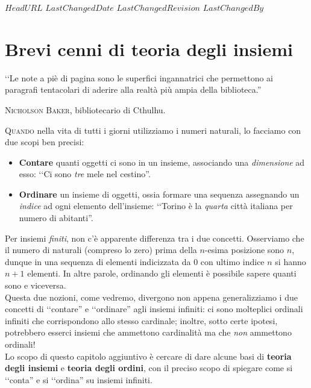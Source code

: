 \svnidlong
{$HeadURL$}
{$LastChangedDate$}
{$LastChangedRevision$}
{$LastChangedBy$}

\chapter{Brevi cenni di teoria degli insiemi}
\begin{introduction}
‘‘Le note a piè di pagina sono le superfici ingannatrici che permettono ai paragrafi tentacolari di aderire alla realtà più ampia della biblioteca.''
\begin{flushright}
	\textsc{Nicholson Baker,} bibliotecario di Cthulhu.
\end{flushright}
\end{introduction}
\lettrine[findent=1pt, nindent=0pt]{Q}{uando} nella vita di tutti i giorni utilizziamo i numeri naturali, lo facciamo con due scopi ben precisi:\\
\begin{itemize}
	\item \textbf{Contare} quanti oggetti ci sono in un insieme, associando una \textit{dimensione} ad esso: ‘‘Ci sono \textit{tre} mele nel cestino''.
	\item \textbf{Ordinare} un insieme di oggetti, ossia formare una sequenza assegnando un \textit{indice} ad ogni elemento dell'insieme: ‘‘Torino è la \textit{quarta} città italiana per numero di abitanti''.
\end{itemize}
\noindent Per insiemi \textit{finiti}, non c'è apparente differenza tra i due concetti. Osserviamo che il numero di naturali (compreso lo zero) prima della $n$-esima posizione sono $n$, dunque in una sequenza di elementi indicizzata da $0$ con ultimo indice $n$ si hanno $n+1$ elementi. In altre parole, ordinando gli elementi è possibile sapere quanti sono e viceversa.\\
Questa due nozioni, come vedremo, divergono non appena generalizziamo i due concetti di ‘‘contare'' e ‘‘ordinare'' agli insiemi infiniti: ci sono molteplici ordinali infiniti che corrispondono allo stesso cardinale; inoltre, sotto certe ipotesi, potrebbero esserci insiemi che ammettono cardinalità ma che \textit{non} ammettono ordinali!\\
Lo scopo di questo capitolo aggiuntivo è cercare di dare alcune basi di \textbf{teoria degli insiemi} e \textbf{teoria degli ordini}, con il preciso scopo di spiegare come si ‘‘conta'' e si ‘‘ordina'' su insiemi infiniti.\\
